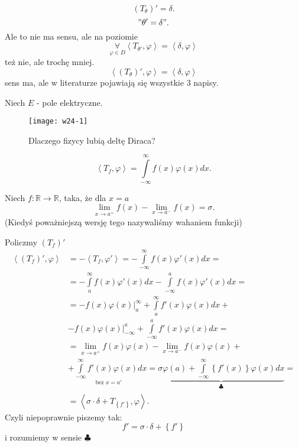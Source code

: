\documentclass[../main.tex]{subfiles}
\begin{document}
\[
    \left( T_\theta \right)' = \delta
.\]
\[
    "\theta' = \delta"
.\]
Ale to nie ma sensu, ale na poziomie
\[
\underset{\varphi\in D}{\forall}     \left<T_{\theta'},\varphi \right> = \left<\delta, \varphi \right>
\]
też nie, ale trochę mniej.
\[
    \left<\left( T_{\theta} \right)', \varphi \right> = \left<\delta, \varphi \right>
\]
sens ma, ale w literaturze pojawiają się wszystkie 3 napisy.
\begin{przyklad}
Niech $E$ - pole elektryczne.
\begin{figure}[h]
    \centering
    \texttt{[image: w24-1]}
    \caption{Dlaczego fizycy lubią deltę Diraca?}
    \label{fig:w24-1}
\end{figure}
\[
    \left<T_f, \varphi \right> = \int\limits_{-\infty}^{\infty} f(x)\varphi(x)dx
.\]
\end{przyklad}
\begin{definicja}
    Niech $f: \mathbb{R}\to \mathbb{R}$, taka, że dla $x = a$
    \[
        \lim_{x \to a^+} f(x) - \lim_{x \to a^-}f(x) = \sigma
    .\]
(Kiedyś poważniejszą wersję tego nazywaliśmy wahaniem funkcji)
\end{definicja}
Policzmy $\left( T_f \right)'$
\begin{align*}
    \left<\left( T_f \right)', \varphi \right> &= -\left<T_f, \varphi' \right> = -\int\limits_{-\infty}^{\infty} f(x)\varphi'(x)dx =\\
    &=-\int\limits_{a}^{\infty} f(x)\varphi'(x)dx - \int\limits_{-\infty}^{a} f(x)\varphi'(x)dx =\\
    &= -f(x)\varphi(x)\Big|_{a}^\infty  + \int\limits_{a}^{\infty} f'(x)\varphi(x)dx +\\
    &- f(x)\varphi(x)\Big|_{-\infty}^a + \int\limits_{-\infty}^{a} f'(x)\varphi(x)dx  =\\
    &= \lim_{x \to a^+}f(x)\varphi(x) - \lim_{x \to a^-}f(x)\varphi(x) +\\
    &+ \underset{\text{bez $x = a'$ }}{\int\limits_{-\infty}^{\infty} f'(x)\varphi(x)dx} = \underbrace{\sigma \varphi(a) + \int\limits_{-\infty}^{\infty} \left\{ f'(x) \right\} \varphi(x)dx}_{\clubsuit} = \\
    &= \left<\sigma \cdot \delta + T_{\left\{ f' \right\} }, \varphi \right>
.\end{align*}
Czyli niepoprawnie piszemy tak:
\[
    f' = \sigma \cdot \delta + \left\{ f' \right\}
\]
i rozumiemy w sensie $\clubsuit$
\end{document}
